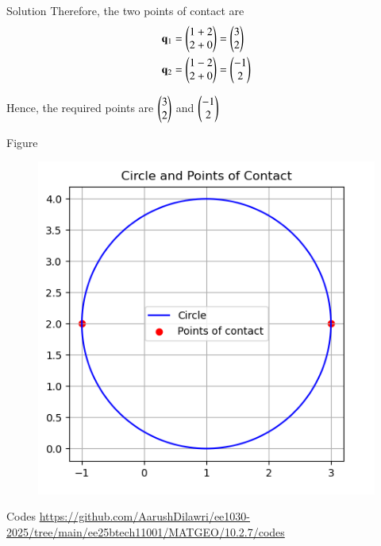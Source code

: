 \documentclass{beamer}
\begin{document}
\begin{frame}{Solution}
Therefore, the two points of contact are
\begin{align}
\mathbf{q}_1 &= \begin{pmatrix}1+2 \\ 2+0\end{pmatrix} = \begin{pmatrix}3 \\ 2\end{pmatrix}\\
\mathbf{q}_2 &= \begin{pmatrix}1-2 \\ 2+0\end{pmatrix} = \begin{pmatrix}-1 \\ 2\end{pmatrix}
\end{align}

Hence, the required points are  $\begin{pmatrix}3 \\ 2\end{pmatrix}$ and $\begin{pmatrix}-1 \\ 2\end{pmatrix}$
\end{frame}

\begin{frame}{Figure}
\begin{figure}[h!]
    \centering
    \includegraphics[height=0.5\textheight, keepaspectratio]{figs/fig.png}
    \label{figure_1}
\end{figure}
\end{frame}

\begin{frame}{Codes}
\url{https://github.com/AarushDilawri/ee1030-2025/tree/main/ee25btech11001/MATGEO/10.2.7/codes}
\end{frame}
\end{document}
